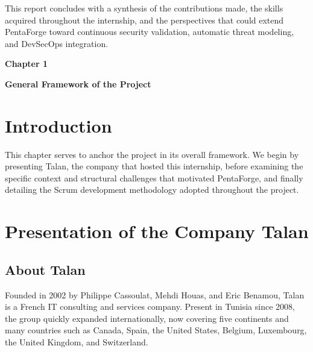 \documentclass[12pt,a4paper]{report}
\begin{document}
\vspace{0.8cm}

This report concludes with a synthesis of the contributions made, the skills acquired
throughout the internship, and the perspectives that could extend PentaForge toward
continuous security validation, automatic threat modeling, and DevSecOps integration.
\newpage
\pagestyle{chapterone}

\vspace*{2cm}

{\fontsize{26}{30}\selectfont \textbf{Chapter 1}}\par

\vspace{1cm}

{\LARGE\bfseries General Framework of the Project}

\vspace{0.8cm}

\setcounter{chapter}{1}
\setcounter{section}{0}

\section*{Introduction}

This chapter serves to anchor the project in its overall framework. We begin by
presenting Talan, the company that hosted this internship, before examining the
specific context and structural challenges that motivated PentaForge, and finally
detailing the Scrum development methodology adopted throughout the project.
\section{Presentation of the Company Talan}

\subsection{About Talan}

Founded in 2002 by Philippe Cassoulat, Mehdi Houas, and Eric Benamou, Talan is a
French IT consulting and services company. Present in Tunisia since 2008, the group
quickly expanded internationally, now covering five continents and many countries such
as Canada, Spain, the United States, Belgium, Luxembourg, the United Kingdom, and
Switzerland.
\end{document}
